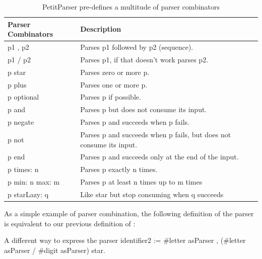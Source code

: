 \documentclass[a4paper,10pt,twoside]{book}
\begin{document}
\begin{table}
  \centering
  \begin{tabular}{lp{}}
    \textbf{Parser Combinators} & \textbf{Description}                                                \\
    \midrule
    p1 , p2                     & Parses p1 followed by p2 (sequence).                                \\
    p1 / p2                     & Parses p1, if that doesn't work parses p2.                          \\
    p star                      & Parses zero or more p.                                              \\
    p plus                      & Parses one or more p.                                               \\
    p optional                  & Parses p if possible.                                               \\
    p and                       & Parses p but does not consume its input.                            \\
    p negate                    & Parses p and succeeds when p fails.                                 \\
    p not                       & Parses p and succeeds when p fails, but does not consume its input. \\
    p end                       & Parses p and succeeds only at the end of the input.                 \\
    p times: n                  & Parses p exactly n times.                                           \\
    p min: n max: m             & Parses p at least n times up to m times                             \\
    p starLazy: q               & Like star but stop consuming when q succeeds                       \\

  \end{tabular}
  \caption{PetitParser pre-defines a multitude of parser combinators}
  \label{tab:parser-combinators}
\end{table}

As a simple example of parser combination, the following definition of
the  parser is equivalent to our previous definition
of :

\begin{script}[identifier2]{A different way to express the  parser}
identifier2 := #letter asParser , (#letter asParser / #digit asParser) star.
\end{script}
\end{document}
